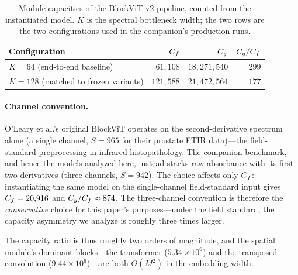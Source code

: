 \begin{table}[h]
\centering
\caption{Module capacities of the BlockViT-v2 pipeline, counted from
the instantiated model. $K$ is the spectral bottleneck width; the two
rows are the two configurations used in the companion's production
runs.}
\label{tab:capacity}
\begin{tabular}{lrrr}
\toprule
Configuration & $C_f$ & $C_g$ & $C_g/C_f$ \\
\midrule
$K = 64$ (end-to-end baseline) & $61{,}108$ & $18{,}271{,}540$ & $299$ \\
$K = 128$ (matched to frozen variants) & $121{,}588$ & $21{,}472{,}564$ & $177$ \\
\bottomrule
\end{tabular}
\end{table}

\paragraph{Channel convention.}
O'Leary et al.'s original BlockViT operates on the second-derivative
spectrum alone (a single channel, $S = 965$ for their prostate FTIR
data)---the field-standard preprocessing in infrared histopathology.
The companion benchmark, and hence the models analyzed here, instead
stacks raw absorbance with its first two derivatives (three channels,
$S = 942$). The choice affects only $C_f$: instantiating the same
model on the single-channel field-standard input gives
$C_f = 20{,}916$ and $C_g/C_f \approx 874$. The three-channel
convention is therefore the \emph{conservative} choice for this
paper's purposes---under the field standard, the capacity asymmetry
we analyze is roughly three times larger.

The capacity ratio is thus roughly two orders of magnitude, and the
spatial module's dominant blocks---the transformer
($5.34 \times 10^6$) and the transposed convolution
($9.44 \times 10^6$)---are both $\Theta(M^2)$ in the embedding width.

